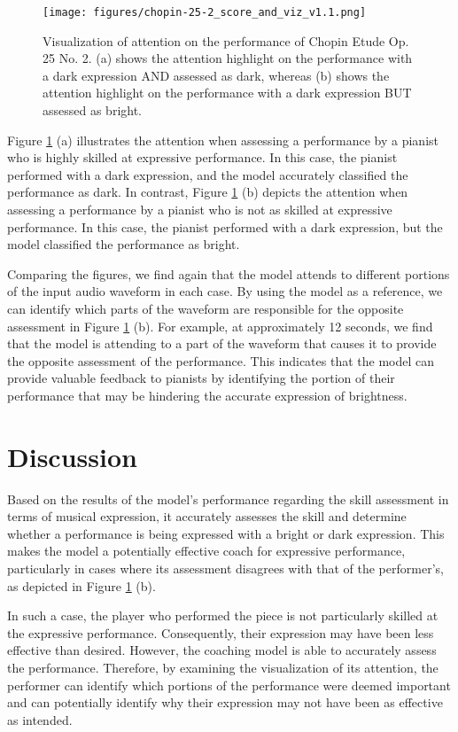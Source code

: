 \documentclass[manuscript,review,anonymous]{acmart}
\begin{document}
\begin{figure}[h!]
  \centering
  \texttt{[image: figures/chopin-25-2\_score\_and\_viz\_v1.1.png]}
  \caption{Visualization of attention on the performance of Chopin Etude Op. 25 No. 2. (a) shows the attention highlight on the performance with a dark expression AND assessed as dark, whereas (b) shows the attention highlight on the performance with a dark expression BUT assessed as bright.}
  \Description{}
  \label{chopin-25-2_attn}
\end{figure}

Figure \ref{chopin-25-2_attn} (a) illustrates the attention when assessing a performance by a pianist who is highly skilled at expressive performance. 
In this case, the pianist performed with a dark expression, and the model accurately classified the performance as dark. 
In contrast, Figure \ref{chopin-25-2_attn} (b) depicts the attention when assessing a performance by a pianist who is not as skilled at expressive performance. 
In this case, the pianist performed with a dark expression, but the model classified the performance as bright. 

Comparing the figures, we find again that the model attends to different portions of the input audio waveform in each case. 
By using the model as a reference, we can identify which parts of the waveform are responsible for the opposite assessment in Figure \ref{chopin-25-2_attn} (b). 
For example, at approximately 12 seconds, we find that the model is attending to a part of the waveform that causes it to provide the opposite assessment of the performance. 
This indicates that the model can provide valuable feedback to pianists by identifying the portion of their performance that may be hindering the accurate expression of brightness.


\section{Discussion}
Based on the results of the model's performance regarding the skill assessment in terms of musical expression, it accurately assesses the skill and determine whether a performance is being expressed with a bright or dark expression.
This makes the model a potentially effective coach for expressive performance, particularly in cases where its assessment disagrees with that of the performer's, as depicted in Figure \ref{chopin-25-2_attn} (b).

In such a case, the player who performed the piece is not particularly skilled at the expressive performance. 
Consequently, their expression may have been less effective than desired. 
However, the coaching model is able to accurately assess the performance.
Therefore, by examining the visualization of its attention, the performer can identify which portions of the performance were deemed important and can potentially identify why their expression may not have been as effective as intended. 
\end{document}
